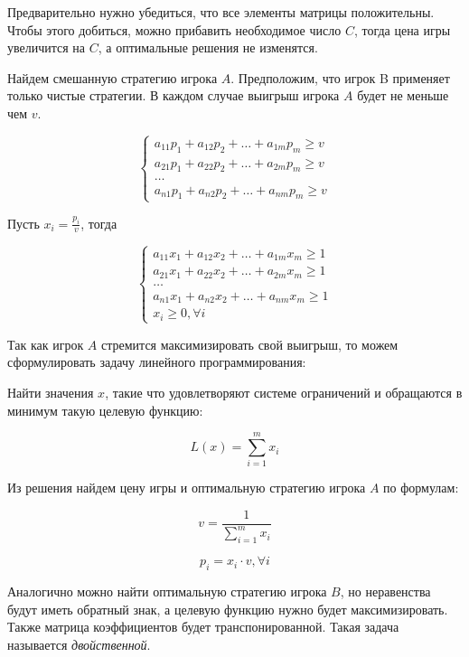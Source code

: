 \documentclass[11pt, a4paper]{article}
\begin{document}
    Предварительно нужно убедиться, что все элементы матрицы положительны.
    Чтобы этого добиться, можно прибавить необходимое число $C$, тогда цена игры увеличится на $C$,
    а оптимальные решения не изменятся.

    Найдем смешанную стратегию игрока $A$.
    Предположим, что игрок B применяет только чистые стратегии.
    В каждом случае выигрыш игрока $A$ будет не меньше чем $v$.

    \begin{equation}
        \begin{cases}
            a_{11}p_1 + a_{12}p_2 + \dots + a_{1m}p_m \ge v\\
            a_{21}p_1 + a_{22}p_2 + \dots + a_{2m}p_m \ge v\\
            \dots\\
            a_{n1}p_1 + a_{n2}p_2 + \dots + a_{nm}p_m \ge v
        \end{cases}\label{eq:equation4}
    \end{equation}

    Пусть $x_i = \frac{p_i}{v}$, тогда

    \begin{equation}
        \begin{cases}
            a_{11}x_1 + a_{12}x_2 + \dots + a_{1m}x_m \ge 1\\
            a_{21}x_1 + a_{22}x_2 + \dots + a_{2m}x_m \ge 1\\
            \dots\\
            a_{n1}x_1 + a_{n2}x_2 + \dots + a_{nm}x_m \ge 1\\
            x_i \ge 0, \forall i
        \end{cases}\label{eq:equation5}
    \end{equation}

    Так как игрок $A$ стремится максимизировать свой выигрыш, то можем
    сформулировать задачу линейного программирования:

    Найти значения $x$, такие что удовлетворяют системе ограничений
    и обращаются в минимум такую целевую функцию:

    \begin{equation}
        L(x) = \sum_{i=1}^m x_i\label{eq:equation6}
    \end{equation}

    Из решения найдем цену игры и оптимальную стратегию игрока $A$
    по формулам:

    \begin{equation}
        v = \frac{1}{\sum_{i=1}^m x_i}\label{eq:equation7}
    \end{equation}

    \begin{equation}
        p_i = x_i\cdot v, \forall i\label{eq:equation8}
    \end{equation}

    Аналогично можно найти оптимальную стратегию игрока $B$, но
    неравенства будут иметь обратный знак, а целевую функцию нужно
    будет максимизировать.
    Также матрица коэффициентов будет транспонированной.
    Такая задача называется \textit{двойственной}.
\end{document}
